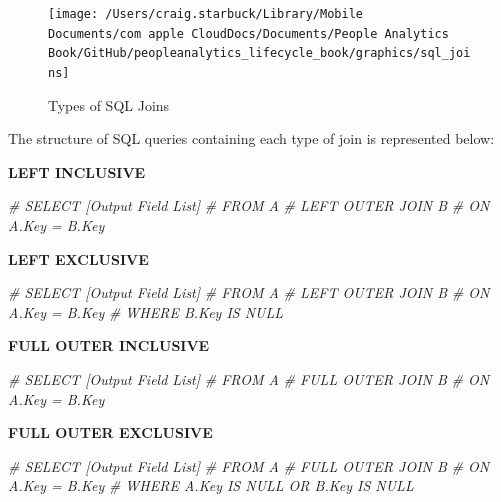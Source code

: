 \documentclass[
]{book}
\newenvironment{Shaded}{\begin{snugshade}}{\end{snugshade}}
\newcommand{\CommentTok}[1]{\textcolor[rgb]{0.56,0.35,0.01}{\textit{#1}}}
\begin{document}
\begin{figure}

{\centering \texttt{[image: /Users/craig.starbuck/Library/Mobile Documents/com~apple~CloudDocs/Documents/People Analytics Book/GitHub/peopleanalytics\_lifecycle\_book/graphics/sql\_joins]} 

}

\caption{Types of SQL Joins}\label{fig:sql-joins}
\end{figure}

The structure of SQL queries containing each type of join is represented below:

\textbf{LEFT INCLUSIVE}

\begin{Shaded}
\begin{Highlighting}[]
\CommentTok{\#  SELECT [Output Field List]}
\CommentTok{\#  FROM A }
\CommentTok{\#  LEFT OUTER JOIN B}
\CommentTok{\#  ON A.Key = B.Key}
\end{Highlighting}
\end{Shaded}

\textbf{LEFT EXCLUSIVE}

\begin{Shaded}
\begin{Highlighting}[]
\CommentTok{\#  SELECT [Output Field List]}
\CommentTok{\#  FROM A }
\CommentTok{\#  LEFT OUTER JOIN B}
\CommentTok{\#  ON A.Key = B.Key}
\CommentTok{\#  WHERE B.Key IS NULL}
\end{Highlighting}
\end{Shaded}

\textbf{FULL OUTER INCLUSIVE}

\begin{Shaded}
\begin{Highlighting}[]
\CommentTok{\#  SELECT [Output Field List]}
\CommentTok{\#  FROM A }
\CommentTok{\#  FULL OUTER JOIN B}
\CommentTok{\#  ON A.Key = B.Key}
\end{Highlighting}
\end{Shaded}

\textbf{FULL OUTER EXCLUSIVE}

\begin{Shaded}
\begin{Highlighting}[]
\CommentTok{\#  SELECT [Output Field List]}
\CommentTok{\#  FROM A }
\CommentTok{\#  FULL OUTER JOIN B}
\CommentTok{\#  ON A.Key = B.Key}
\CommentTok{\#  WHERE A.Key IS NULL OR B.Key IS NULL  }
\end{Highlighting}
\end{Shaded}
\end{document}
